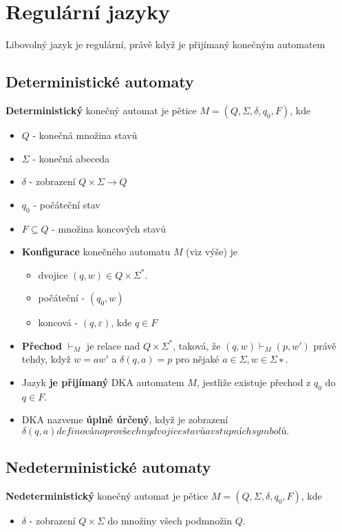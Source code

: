 \documentclass{szzclass}
\begin{document}
\section{Regulární jazyky}
\begin{theorem}
Libovolný jazyk je regulární, právě když je přijímaný konečným automatem
\end{theorem}

\subsection{Deterministické automaty}
\begin{definition}
\textbf{Deterministický} konečný automat je pětice $M=(Q,\Sigma,\delta,q_0,F)$, kde
\begin{itemize}
\item $Q$ - konečná množina stavů
\item $\Sigma$ - konečná abeceda
\item $\delta$ - zobrazení $Q\times\Sigma \to Q$
\item $q_0$ - počáteční stav
\item $F\subseteq Q$ - množina koncových stavů
\end{itemize}
\end{definition}

\begin{itemize}
\item \textbf{Konfigurace} konečného automatu $M$ (viz výše) je 
  \begin{itemize}
  \item dvojice $(q,w)\in Q\times \Sigma^{*}$.
  \item počáteční - $(q_0,w)$
  \item koncová - $(q,\varepsilon)$, kde $q\in F$
  \end{itemize}
\item \textbf{Přechod} $\vdash_M$ je relace nad $Q\times\Sigma^{*}$, taková, že $(q, w) \vdash_M (p, w')$ právě tehdy, když $w = aw'$ a $\delta(q, a) = p$ pro nějaké $a\in\Sigma,w \in \Sigma{∗}.$
\item Jazyk \textbf{je přijímaný} DKA automatem $M$, jestliže existuje přechod z $q_0$ do $q\in F$.
\item DKA nazveme \textbf{úplně úrčený}, když je zobrazení $\delta(q,a) definováno pro všechny dvojice stavů a vstupních symbolů.$
\end{itemize}

\subsection{Nedeterministické automaty}
\begin{definition}
\textbf{Nedeterministický} konečný automat je pětice $M=(Q,\Sigma,\delta,q_0,F)$, kde
\begin{itemize}
\item $\delta$ - zobrazení $Q\times\Sigma$ do množiny všech podmnožin $Q$.
\end{itemize}
\end{definition}
\end{document}
